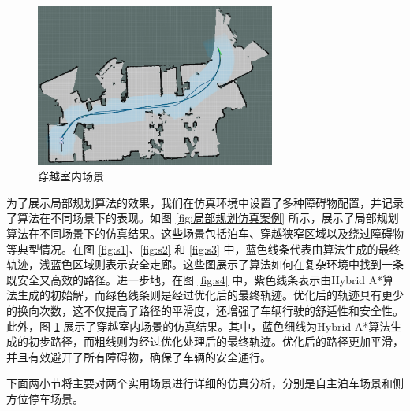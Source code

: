 \documentclass[master,academic]{ysuthesis} %
\begin{document}
	\begin{figure}[!ht]
		\centering
		\includegraphics[width=0.7\textwidth]{nmpcyuewa1.png}
		\caption{穿越室内场景}
		\label{fig:nmpcyuewa1}
	\end{figure}

	为了展示局部规划算法的效果，我们在仿真环境中设置了多种障碍物配置，并记录了算法在不同场景下的表现。如图 \ref{fig:局部规划仿真案例} 所示，展示了局部规划算法在不同场景下的仿真结果。这些场景包括泊车、穿越狭窄区域以及绕过障碍物等典型情况。在图 \ref{fig:s1}、\ref{fig:s2} 和 \ref{fig:s3} 中，蓝色线条代表由算法生成的最终轨迹，浅蓝色区域则表示安全走廊。这些图展示了算法如何在复杂环境中找到一条既安全又高效的路径。进一步地，在图 \ref{fig:s4} 中，紫色线条表示由Hybrid A*算法生成的初始解，而绿色线条则是经过优化后的最终轨迹。优化后的轨迹具有更少的换向次数，这不仅提高了路径的平滑度，还增强了车辆行驶的舒适性和安全性。此外，图 \ref{fig:nmpcyuewa1} 展示了穿越室内场景的仿真结果。其中，蓝色细线为Hybrid A*算法生成的初步路径，而粗线则为经过优化处理后的最终轨迹。优化后的路径更加平滑，并且有效避开了所有障碍物，确保了车辆的安全通行。

	下面两小节将主要对两个实用场景进行详细的仿真分析，分别是自主泊车场景和侧方位停车场景。
\end{document}
